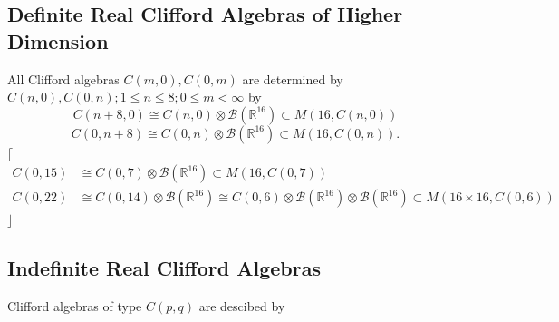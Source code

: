 \documentclass[aps,preprint]{revtex4}%
\begin{document}
\subsection{Definite Real Clifford Algebras of Higher Dimension}

All Clifford algebras $C\left(  m,0\right)  ,C\left(  0,m\right)  $ are
determined by $C\left(  n,0\right)  ,C\left(  0,n\right)  ;1\leq n\leq8;0\leq
m<\infty$ by
\begin{equation}
C\left(  n+8,0\right)  \cong C\left(  n,0\right)  \otimes\mathcal{B}\left(
\mathbb{R}^{16}\right)  \subset M\left(  16,C\left(  n,0\right)  \right)
\end{equation}%
\begin{equation}
C\left(  0,n+8\right)  \cong C\left(  0,n\right)  \otimes\mathcal{B}\left(
\mathbb{R}^{16}\right)  \subset M\left(  16,C\left(  0,n\right)  \right)  .
\end{equation}
$\lceil$%
\begin{align}
C\left(  0,15\right)   &  \cong C\left(  0,7\right)  \otimes\mathcal{B}\left(
\mathbb{R}^{16}\right)  \subset M\left(  16,C\left(  0,7\right)  \right) \\
C\left(  0,22\right)   &  \cong C\left(  0,14\right)  \otimes\mathcal{B}%
\left(  \mathbb{R}^{16}\right)  \cong C\left(  0,6\right)  \otimes
\mathcal{B}\left(  \mathbb{R}^{16}\right)  \otimes\mathcal{B}\left(
\mathbb{R}^{16}\right)  \subset M\left(  16\times16,C\left(  0,6\right)
\right)
\end{align}
$\rfloor$

\subsection{Indefinite Real Clifford Algebras}

Clifford algebras of type $C\left(  p,q\right)  $ are descibed by
\end{document}
